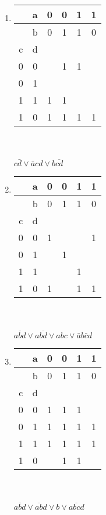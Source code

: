 \documentclass[11pt,a4paper]{article}
\begin{document}
    \begin{enumerate}[1.]
      \item
        \begin{tabular}{|cc|c|c|c|c|} \hline
          &a&0&0&1&1\\ \hline
          &b&0&1&1&0\\ \hline
          c&d&&&&\\ \hline
          0&0&&1&1&\\ \hline
          0&1&&&&\\ \hline
          1&1&1&1&&\\ \hline
          1&0&1&1&1&1\\ \hline
        \end{tabular}\\\\
        $c\bar{d}\vee\bar{a}cd\vee b\overline{cd}$
        \item
          \begin{tabular}{|cc|c|c|c|c|} \hline
            &a&0&0&1&1\\ \hline
            &b&0&1&1&0\\ \hline
            c&d&&&&\\ \hline
            0&0&1&&&1\\ \hline
            0&1&&1&&\\ \hline
            1&1&&&1&\\ \hline
            1&0&1&&1&1\\ \hline
          \end{tabular}\\\\
          $\overline{abd}\vee a\overline{bd}\vee abc \vee \bar{a}b\bar{c}d$
        \item
          \begin{tabular}{|cc|c|c|c|c|} \hline
            &a&0&0&1&1\\ \hline
            &b&0&1&1&0\\ \hline
            c&d&&&&\\ \hline
            0&0&1&1&1&\\ \hline
            0&1&1&1&1&1\\ \hline
            1&1&1&1&1&1\\ \hline
            1&0&&1&1&\\ \hline
          \end{tabular}\\\\
          $a\bar{b}d\vee\overline{ab}d\vee b \vee \overline{abcd}$
    \end{enumerate}
\end{document}
